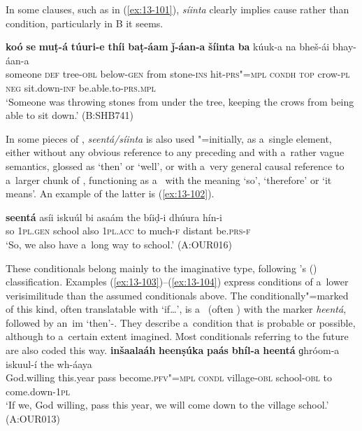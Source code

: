 In some clauses, such as in (\ref{ex:13-101}), \textit{síinta} clearly implies cause rather than condition, particularly in B it seems.

\begin{exe}
\ex
\label{ex:13-101}
\gll \textbf{koó} \textbf{se} \textbf{muṭ-á} \textbf{túuri-e} \textbf{thíi} \textbf{baṭ-áam} \textbf{ǰ-áan-a} \textbf{šíinta} \textbf{ba} kúuk-a
na bheš-ái  bhay-áan-a \\
someone \textsc{def} tree-\textsc{obl} below-\textsc{gen} from stone-\textsc{ins}  hit-\textsc{prs"=mpl} \textsc{condh} \textsc{top} crow-\textsc{pl} \textsc{neg} sit.down-\textsc{inf} be.able.to-\textsc{prs.mpl} \\
\glt `Someone was throwing stones from under the tree, keeping the crows from being able to sit down.' (B:SHB741) 
\end{exe}

In some pieces of , \textit{seentá/síinta} is also used "=initially, as a~single element, either without any obvious reference to any preceding  and with a~rather vague semantics, glossed as `then' or `well', or with a~very general causal reference to a~larger chunk of , functioning as a~ with the meaning `so', `therefore' or `it means'. An example of the latter is (\ref{ex:13-102}).

\begin{exe}
\ex
\label{ex:13-102}
\gll \textbf{seentá} asíi iskuúl bi asaám the bíiḍ-i dhúura  hín-i \\
so \textsc{1pl.gen} school also \textsc{1pl.acc} to much-\textsc{f} distant be.\textsc{prs-f} \\
\glt `So, we also have a~long way to school.' (A:OUR016) 
\end{exe}

 These conditionals belong mainly to the imaginative type, following \citeauthor{thompsonetal2007}'s (\citeyear[259--260]{thompsonetal2007}) classification. Examples (\ref{ex:13-103})--(\ref{ex:13-104}) express conditions of a~lower verisimilitude than the assumed conditionals above. The conditionally"=marked  of this kind, often translatable with `if{\ldots}', is a~ (often )  with the  marker \textit{heentá}, followed by an~im `then'-. They describe a~condition that is probable or possible, although to a~certain extent imagined. Most conditionals referring to the future are also coded this way.
\ea
\label{ex:13-103}
\gll \textbf{inšaalaáh} \textbf{heenṣúka} \textbf{paás} \textbf{bhíl-a} \textbf{heentá} ɡhróom-a iskuul-í the wh-áaya\\
God.willing this.year pass become.\textsc{pfv"=mpl} \textsc{condl} village-\textsc{obl} school-\textsc{obl} to come.down-\textsc{1pl}\\
\glt `If we, God willing, pass this year, we will come down to the village school.' (A:OUR013)

